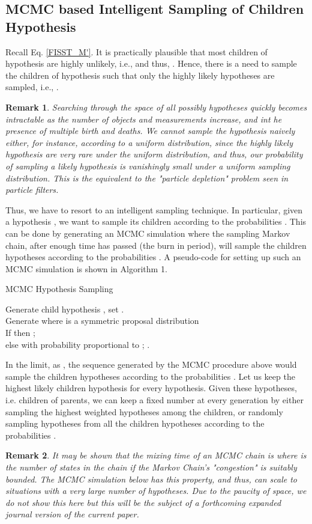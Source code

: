 \documentclass[10pt, conference]{IEEEtran}
\newtheorem{remark}{Remark}
\begin{document}
\subsection{MCMC based Intelligent Sampling of Children Hypothesis}
Recall Eq. \ref{FISST_M'}. It is practically plausible that most children  of hypothesis  are highly unlikely, i.e.,  and thus, . Hence, there is a need to sample the children  of hypothesis  such that only the highly likely hypotheses are sampled, i.e., . 

\begin{remark}
Searching through the space of all possibly hypotheses quickly becomes intractable as the number of objects and measurements increase, and int he presence of multiple birth and deaths.
We cannot sample the hypothesis naively  either, for instance, according to a uniform distribution, since the highly likely hypothesis are very rare under the uniform distribution, and thus, our probability of sampling a likely hypothesis is vanishingly small under a uniform sampling distribution. This is the equivalent to the "particle depletion" problem seen in particle filters.
\end{remark}
Thus, we have to resort to an intelligent sampling technique.
In particular, given a hypothesis , we want to sample its children according to the probabilities . This can be done by generating an MCMC simulation where the sampling Markov chain, after enough time has passed (the burn in period), will sample the children hypotheses according to the probabilities .  A pseudo-code for setting up such an MCMC simulation is shown in Algorithm 1.
\begin{algorithm}
\caption{MCMC Hypothesis Sampling}
Generate child hypothesis , set .\\
Generate  where  is a symmetric proposal distribution\\
If  then ;\\
else  with probability proportional to ; .
\end{algorithm}
In the limit, as , the sequence  generated by the MCMC procedure above would sample the children hypotheses according to the probabilities . Let us keep the highest likely  children hypothesis for every hypothesis.
Given these  hypotheses, i.e.  children of  parents, we can keep a fixed number  at every generation by either sampling the  highest weighted hypotheses among the children, or randomly sampling  hypotheses from all the children hypotheses according to the probabilities . \\
\begin{remark}
It may be shown that the mixing time of an MCMC chain is  where  is the number of states in the chain \cite{MCMT} if the Markov Chain's  "congestion" is suitably bounded. The MCMC simulation below has this property, and thus, can scale to situations with a very large number of hypotheses. Due to the paucity of space, we do not show this here but this will be the subject of a forthcoming expanded journal version of the current paper.
\end{remark}
\end{document}
